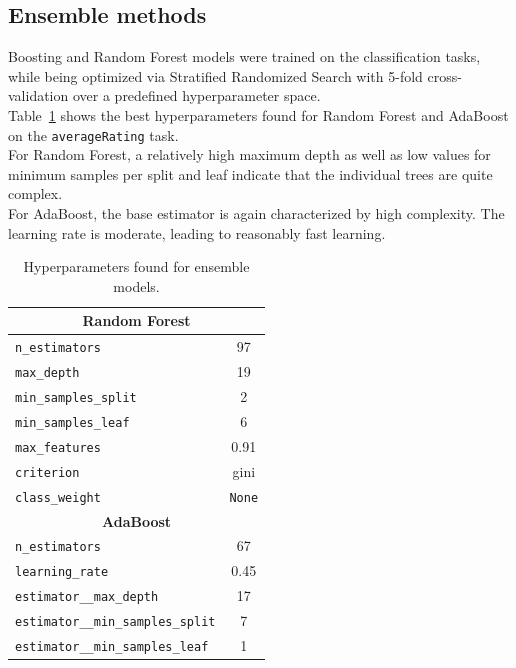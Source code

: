\subsection{Ensemble methods}
\begin{table}[H]
    \centering
    \begin{minipage}{0.55\textwidth}
        Boosting and Random Forest models were trained on the
        classification tasks, while being optimized via Stratified
        Randomized Search with 5-fold
        cross-validation over a predefined hyperparameter space.\\

        Table~\ref{tab:ensemble_param} shows the best
        hyperparameters found for Random Forest and AdaBoost on the
        \texttt{averageRating} task.\\

        For Random Forest, a relatively high maximum depth as well
        as low values for minimum samples per split and leaf
        indicate that the individual trees are quite complex.\\

        For AdaBoost, the base estimator is again characterized by
        high complexity. The learning rate is moderate, leading to
        reasonably fast learning.
    \end{minipage}
    \hfill
    \begin{minipage}{0.4\textwidth}
        \centering
        \begin{tabular}{lc}
        \hline
        \multicolumn{2}{c}{\textbf{Random Forest}} \\
        \hline
        \texttt{n\_estimators} & 97 \\
        \texttt{max\_depth} & 19 \\
        \texttt{min\_samples\_split} & 2 \\
        \texttt{min\_samples\_leaf} & 6 \\
        \texttt{max\_features} & 0.91 \\
        \texttt{criterion} & gini \\
        \texttt{class\_weight} & \texttt{None} \\
        \hline
        \multicolumn{2}{c}{\textbf{AdaBoost}} \\
        \hline
        \texttt{n\_estimators} & 67 \\
        \texttt{learning\_rate} & 0.45 \\
        \texttt{estimator\_\_max\_depth} & 17 \\
        \texttt{estimator\_\_min\_samples\_split} & 7 \\
        \texttt{estimator\_\_min\_samples\_leaf} & 1 \\
        \hline
        \end{tabular}
        \caption{Hyperparameters found for ensemble models.}
        \label{tab:ensemble_param}
    \end{minipage}
\end{table}

